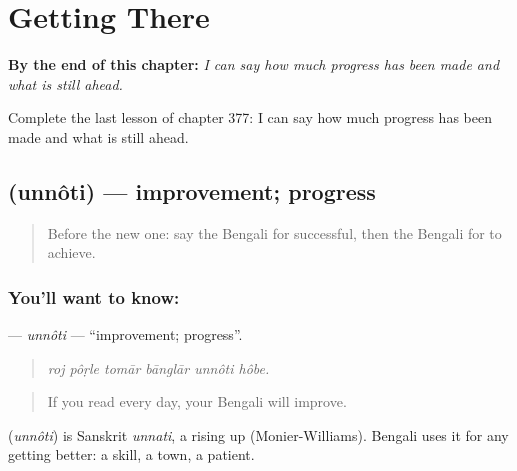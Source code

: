 
\chapter{Getting There}
\label{ch:bn-getting-there}

\begin{chapteropening}
\textbf{By the end of this chapter:} \emph{I can say how much progress has been made and what is still ahead.}

Complete the last lesson of chapter 377: I can say how much progress has been made and what is still ahead.
\end{chapteropening}

\section[\texorpdfstring{\bn{উন্নতি} (unnôti)}{উন্নতি (unnôti)}]{ (unnôti) — improvement; progress}

\label{lesson:BN-C377-unnoti}



\begin{quote}
Before the new one: say the Bengali for successful, then the Bengali for to achieve.
\end{quote}

\subsection*{You'll want to know: }
\textbf{} — \emph{unnôti} — \textquotedblleft{}improvement; progress\textquotedblright{}.

\begin{quote}
     
\end{quote}

\begin{quote}
\emph{roj pôṛle tomār bānglār unnôti hôbe.}
\end{quote}

\begin{quote}
If you read every day, your Bengali will improve.
\end{quote}

\begin{cousinweb}
\textbf{} (\emph{unnôti}) is Sanskrit \emph{unnati}, a rising up (Monier-Williams). Bengali uses it for any getting better: a skill, a town, a patient.
\end{cousinweb}

